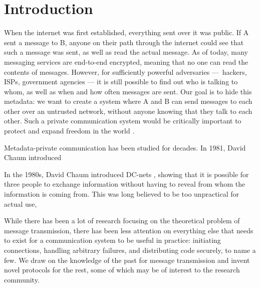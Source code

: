 \section{Introduction}

When the internet was first established, everything sent over it was public. If A sent a message to B, anyone on their path through the internet could see that such a message was sent, as well as read the actual message. As of today, many messaging services are end-to-end encrypted, meaning that no one can read the contents of messages. However, for sufficiently powerful adversaries — hackers, ISPs, government agencies — it is still possible to find out who is talking to whom, as well as when and how often messages are sent. Our goal is to hide this metadata: we want to create a system where A and B can send messages to each other over an untrusted network, without anyone knowing that they talk to each other. Such a private communication system would be critically important to protect and expand freedom in the world \cite{arvid}.

Metadata-private communication has been studied for decades. In 1981, David Chaum introduced

In the 1980s, David Chaum introduced DC-nets \cite{chaum1988dining}, showing that it is possible for three people to exchange information without having to reveal from whom the information is coming from. This was long believed to be too unpractical for actual use,

While there has been a lot of research focusing on the theoretical problem of message transmission, there has been less attention on everything else that needs to exist for a communication system to be useful in practice: initiating connections, handling arbitrary failures, and distributing code securely, to name a few. We draw on the knowledge of the past for message transmission and invent novel protocols for the rest, some of which may be of interest to the research community.